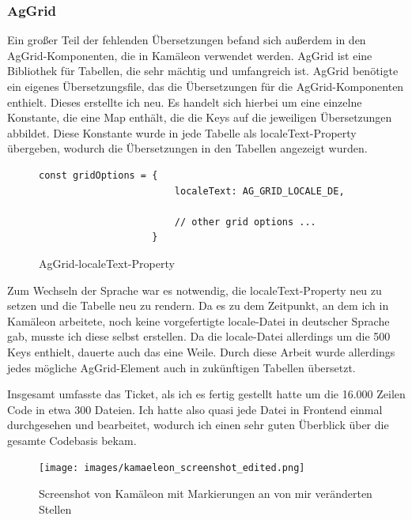 \documentclass[11pt, a4paper, oneside]{scrartcl}
\begin{document}
            \subsubsection{AgGrid}
            Ein großer Teil der fehlenden Übersetzungen befand sich außerdem in den
            AgGrid-Komponenten, die in Kamäleon verwendet werden.
            AgGrid ist eine Bibliothek für Tabellen, die sehr mächtig und umfangreich  ist.
            AgGrid benötigte ein eigenes Übersetzungsfile, das die Übersetzungen für die
            AgGrid-Komponenten enthielt.
            Dieses erstellte ich neu.
            Es handelt sich hierbei um eine einzelne Konstante, die eine Map enthält, die die
            Keys auf die jeweiligen Übersetzungen abbildet.
            Diese Konstante wurde in jede Tabelle als localeText-Property übergeben, wodurch die
            Übersetzungen in den Tabellen angezeigt wurden.\par
            \begin{figure}[h!]
                \centering
                \begin{lstlisting}[language=TS, frame=single, basicstyle=\ttfamily\small]
                    const gridOptions = {
                        localeText: AG_GRID_LOCALE_DE,

                        // other grid options ...
                    }
                \end{lstlisting}
                \caption{AgGrid-localeText-Property}
            \end{figure}
            Zum Wechseln der Sprache war es notwendig, die localeText-Property neu zu setzen und die
            Tabelle neu zu rendern.
            Da es zu dem Zeitpunkt, an dem ich in Kamäleon arbeitete, noch keine vorgefertigte
            locale-Datei in deutscher Sprache gab, musste ich diese selbst erstellen.
            Da die locale-Datei allerdings um die 500 Keys enthielt, dauerte auch das eine Weile.
            Durch diese Arbeit wurde allerdings jedes mögliche AgGrid-Element auch in zukünftigen
            Tabellen übersetzt.\par
            Insgesamt umfasste das Ticket, als ich es fertig gestellt hatte um die 16.000 Zeilen
            Code in etwa 300 Dateien.
            Ich hatte also quasi jede Datei in Frontend einmal durchgesehen und bearbeitet,
            wodurch ich einen sehr guten Überblick über die gesamte Codebasis bekam.
            \begin{figure}[H] %
                \centering
                \texttt{[image: images/kamaeleon\_screenshot\_edited.png]}
                \caption{Screenshot von Kamäleon mit Markierungen an von mir veränderten Stellen} 
            \end{figure}
\end{document}
